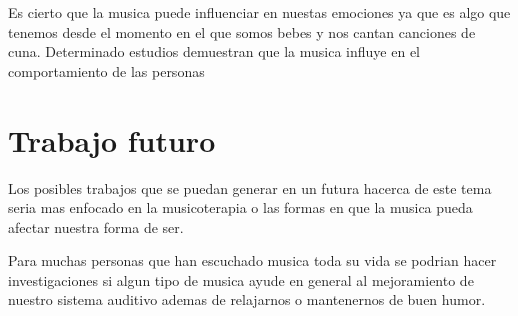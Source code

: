 \documentclass{bmcart}
\begin{document}
Es cierto que la musica puede influenciar en nuestas emociones ya que es algo que tenemos desde el momento en el que somos bebes y nos cantan canciones de cuna.
Determinado estudios demuestran que la musica influye en el comportamiento de las personas 
\section*{Trabajo futuro}
Los posibles trabajos que se puedan generar en un futura hacerca de este tema seria mas enfocado en la musicoterapia o las formas en que la musica pueda afectar nuestra forma de ser.

Para muchas personas que han escuchado musica toda su vida se podrian hacer investigaciones si algun tipo de musica ayude en general al mejoramiento de nuestro sistema auditivo ademas de relajarnos o mantenernos de buen humor.
\end{document}
